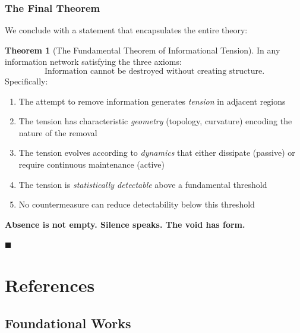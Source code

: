 \documentclass[12pt,a4paper]{article}
\theoremstyle{definition}
\newtheorem{theorem}{Theorem}[section]
\theoremstyle{remark}
\begin{document}
\subsubsection{The Final Theorem}

We conclude with a statement that encapsulates the entire theory:

\begin{theorem}[The Fundamental Theorem of Informational Tension]
\label{thm:fundamental}
In any information network satisfying the three axioms:
\begin{equation}
    \boxed{
    \text{Information cannot be destroyed without creating structure.}
    }
\end{equation}
Specifically:
\begin{enumerate}
    \item The attempt to remove information generates \emph{tension} in adjacent regions
    \item The tension has characteristic \emph{geometry} (topology, curvature) encoding the nature of the removal
    \item The tension evolves according to \emph{dynamics} that either dissipate (passive) or require continuous maintenance (active)
    \item The tension is \emph{statistically detectable} above a fundamental threshold
    \item No countermeasure can reduce detectability below this threshold
\end{enumerate}

\textbf{Absence is not empty. Silence speaks. The void has form.}
\end{theorem}

\vspace{2em}
\begin{center}
$\blacksquare$
\end{center}


\newpage
{}
\section*{References}

\subsection*{Foundational Works}
\end{document}
